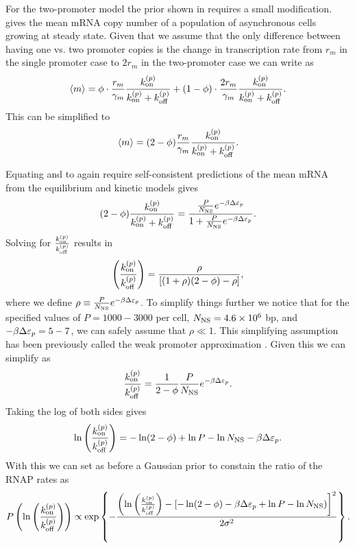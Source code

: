 For the two-promoter model the prior shown in  requires a
small modification.  gives the mean mRNA copy number of a
population of asynchronous cells growing at steady state. Given that we assume
that the only difference between having one vs. two promoter copies is the
change in transcription rate from $r_m$ in the single promoter case to $2 r_m$
in the two-promoter case we can
write  as
\begin{equation}
  \left\langle m \right\rangle = \phi \cdot {r_m \over \gamma _m} {k^{(p)}_{\text{on}}\over k^{(p)}_{\text{on}}+ k^{(p)}_{\text{off}}} +
      (1 -\phi) \cdot {2 r_m \over \gamma _m} {k^{(p)}_{\text{on}}\over k^{(p)}_{\text{on}}+ k^{(p)}_{\text{off}}}.
\end{equation}
This can be simplified to
\begin{equation}
  \left\langle m \right\rangle = (2 - \phi) {r_m \over \gamma _m} {k^{(p)}_{\text{on}} \over k^{(p)}_{\text{on}} + k^{(p)}_{\text{off}}}.
  \label{seq_mean_m_double_rates}
\end{equation}

Equating  and  to again
require self-consistent predictions of the mean mRNA from the equilibrium and
kinetic models gives
\begin{equation}
  (2 - \phi) {k^{(p)}_{\text{on}} \over k^{(p)}_{\text{on}} + k^{(p)}_{\text{off}}} =
  {{P \over N_\text{NS}} e^{-\beta\Delta\varepsilon_p}
  \over 1 + {P \over N_\text{NS}} e^{-\beta\Delta\varepsilon_p}}.
\end{equation}
Solving for $k^{(p)}_{\text{on}} \over k^{(p)}_{\text{off}}$ results in
\begin{equation}
  \left({k^{(p)}_{\text{on}} \over k^{(p)}_{\text{off}}}\right) =
  {\rho \over \left[ (1 + \rho)(2 - \phi) - \rho \right]},
  \label{seq_kinetic_thermo_equiv}
\end{equation}
where we define $\rho \equiv {P \over N_\text{NS}} e^{-\beta\Delta\varepsilon_p}$. To simplify things
further we notice that for the specified values of $P = 1000 - 3000$ per cell,
$N_\text{NS} = 4.6 \times 10^6$ bp, and $-\beta\Delta\varepsilon_p = 5 - 7$, we can safely assume that
$\rho \ll 1$. This simplifying assumption has been previously called the weak
promoter approximation \cite{Garcia2011c}. Given this we can simplify
 as
\begin{equation}
  {k^{(p)}_{\text{on}}\over k^{(p)}_{\text{off}}} = {1 \over 2 - \phi} {P \over N_\text{NS}} e^{-\beta\Delta\varepsilon_p}.
\end{equation}
Taking the log of both sides gives
\begin{equation}
  \ln\left({k^{(p)}_{\text{on}} \over k^{(p)}_{\text{off}}}\right) = -\ln (2 - \phi) + \ln P - \ln N_\text{NS}
  - \beta\Delta\varepsilon_p.
\end{equation}
With this we can set as before a Gaussian prior to constain the ratio of the
RNAP rates as
\begin{equation}
  P\left(\ln \left({k^{(p)}_{\text{on}} \over k^{(p)}_{\text{off}}}\right) \right)  \propto
  \exp \left\{ - {\left(\ln \left({k^{(p)}_{\text{on}} \over k^{(p)}_{\text{off}}}\right) -
  \left[-\ln(2 - \phi) -\beta\Delta\varepsilon_p + \ln P - \ln N_\text{NS} \right) \right]^2
  \over 2 \sigma^2} \right\}.
  \label{seq_prior_double}
\end{equation}

